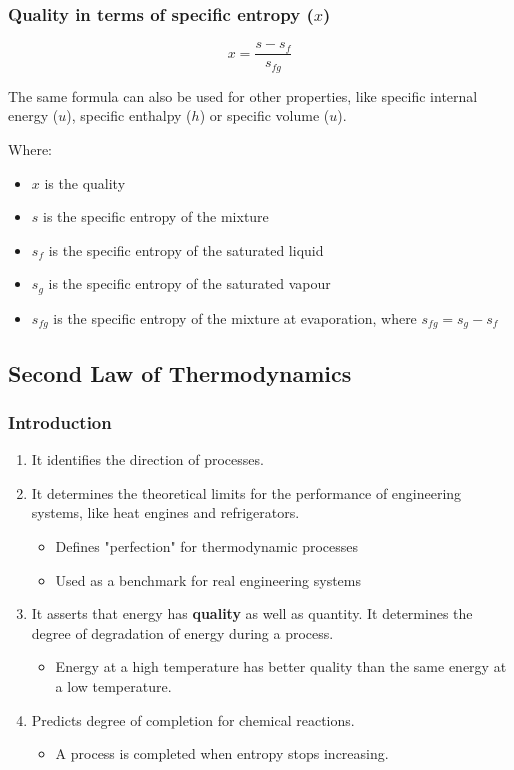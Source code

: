 \documentclass[11pt]{article}
\begin{document}
 \newpage
\subsubsection{Quality in terms of specific entropy (\(x\))}
\label{sec:orgf29af16}
\[x = \frac{s - s_f}{s_{fg}}\]

The same formula can also be used for other properties, like specific internal energy (\(u\)), specific enthalpy (\(h\)) or specific volume (\(u\)).

Where:
\begin{itemize}
\item \(x\) is the quality
\item \(s\) is the specific entropy of the mixture
\item \(s_f\) is the specific entropy of the saturated liquid
\item \(s_g\) is the specific entropy of the saturated vapour
\item \(s_{fg}\) is the specific entropy of the mixture at evaporation, where \(s_{fg} = s_g - s_f\)
\end{itemize}
\subsection{Second Law of Thermodynamics}
\label{sec:org7f78048}

\subsubsection{Introduction}
\label{sec:org077caf8}
\begin{enumerate}
\item It identifies the direction of processes.
\item It determines the theoretical limits for the performance of engineering systems, like heat engines and refrigerators.
\begin{itemize}
\item Defines "perfection" for thermodynamic processes
\item Used as a benchmark for real engineering systems
\end{itemize}
\item It asserts that energy has \textbf{quality} as well as quantity. It determines the degree of degradation of energy during a process.
\begin{itemize}
\item Energy at a high temperature has better quality than the same energy at a low temperature.
\end{itemize}
\item Predicts degree of completion for chemical reactions.
\begin{itemize}
\item A process is completed when entropy stops increasing.
\end{itemize}
\end{enumerate}
\end{document}
